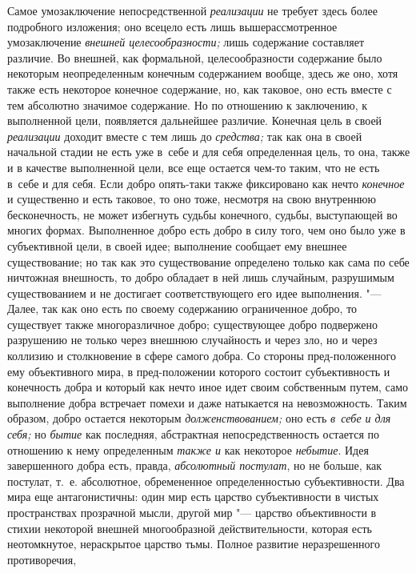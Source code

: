 Самое умозаключение непосредственной
{\em реализации} не
требует здесь более подробного изложения; оно всецело есть лишь
вышерассмотренное умозаключение
{\em внешней целесообразности;}
лишь содержание составляет различие. Во внешней, как
формальной, целесообразности содержание было некоторым неопределенным
конечным содержанием вообще, здесь же оно, хотя также есть некоторое
конечное содержание, но, как таковое, оно есть вместе с тем абсолютно
значимое содержание. Но по отношению к заключению, к выполненной цели,
появляется дальнейшее различие. Конечная цель в своей
{\em реализации} доходит
вместе с тем лишь до {\em средства;}
так как она в своей начальной стадии не есть уже в~себе и для
себя определенная цель, то она, также и в качестве выполненной цели, все
еще остается чем-то таким, что не есть в~себе и для себя. Если добро
опять-таки также фиксировано как нечто
{\em конечное} и
существенно и есть таковое, то оно тоже, несмотря на свою внутреннюю
бесконечность, не может избегнуть судьбы конечного, судьбы, выступающей во
многих формах. Выполненное добро есть добро в силу того, чем оно было уже в
субъективной цели, в своей идее; выполнение сообщает ему внешнее
существование; но так как это существование определено только как сама по
себе ничтожная внешность, то добро обладает в ней лишь случайным,
разрушимым существованием и не достигает соответствующего его идее
выполнения. "--- Далее, так как оно есть по своему содержанию
ограниченное добро, то существует также многоразличное добро; существующее
добро подвержено разрушению не только через внешнюю случайность и через
зло, но и через коллизию и столкновение в сфере самого добра. Со стороны
пред-положенного ему объективного мира, в пред-положении которого состоит
субъективность и конечность добра и который как нечто иное идет своим
собственным путем, само выполнение добра встречает помехи и даже натыкается
на невозможность. Таким образом, добро остается некоторым
{\em долженствованием;}
оно есть {\em в~себе и для
себя;} но {\em бытие}
как последняя, абстрактная непосредственность остается по
отношению к нему определенным {\em также
и} как некоторое
{\em небытие}. Идея
завершенного добра есть, правда,
{\em абсолютный постулат},
но не больше, как постулат, т.~е. абсолютное, обремененное
определенностью субъективности. Два мира еще антагонистичны: один мир есть
царство субъективности в чистых пространствах прозрачной мысли, другой мир
"--- царство объективности в стихии некоторой внешней
многообразной действительности, которая есть неотомкнутое, нераскрытое
царство тьмы. Полное развитие неразрешенного противоречия,
